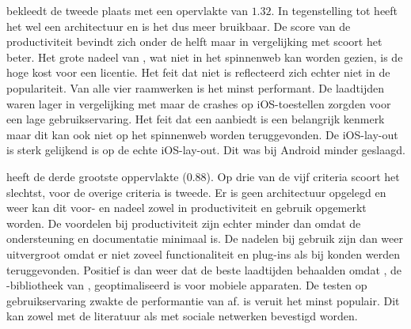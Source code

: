 \kendo{} bekleedt de tweede plaats met een opervlakte van $1.32$.
In tegenstelling tot \jqm{} heeft het wel een architectuur en is het dus meer bruikbaar.
De score van de productiviteit bevindt zich onder de helft maar in vergelijking met \st{} scoort het beter.
Het grote nadeel van \kendo{},  wat niet in het spinnenweb kan worden gezien,  is de hoge kost voor een licentie.
Het feit dat \kendo{} niet  is reflecteerd zich echter niet in de populariteit.
Van alle vier raamwerken is \kendo{} het minst performant.
De laadtijden waren lager in vergelijking met \st{} maar de crashes op iOS-toestellen zorgden voor een lage gebruikservaring.
Het feit dat \kendo{} een  aanbiedt is een belangrijk kenmerk maar dit kan ook niet op het spinnenweb worden teruggevonden.
De iOS-lay-out is sterk gelijkend is op de echte iOS-lay-out.
Dit was bij Android minder geslaagd.


\lungo{} heeft de derde grootste oppervlakte ($0.88$).
Op drie van de vijf criteria scoort \lungo{} het slechtst,  voor de overige criteria is \lungo{} tweede.
Er is geen architectuur opgelegd en weer kan dit voor- en nadeel zowel in productiviteit en gebruik opgemerkt worden.
De voordelen bij productiviteit zijn echter minder dan \jqm{} omdat de ondersteuning en documentatie minimaal is.
De nadelen bij gebruik zijn dan weer uitvergroot omdat er niet zoveel functionaliteit en plug-ins als bij \jqm{} konden werden teruggevonden.
Positief is dan weer dat \lungo{} de beste laadtijden behaalden omdat \quo{}, de \js{}-bibliotheek van \lungo{},  geoptimaliseerd is voor mobiele apparaten.
De testen op gebruikservaring zwakte de performantie van \lungo{} af.
\lungo{} is veruit het minst populair.
Dit kan zowel met de literatuur als met sociale netwerken bevestigd worden.


